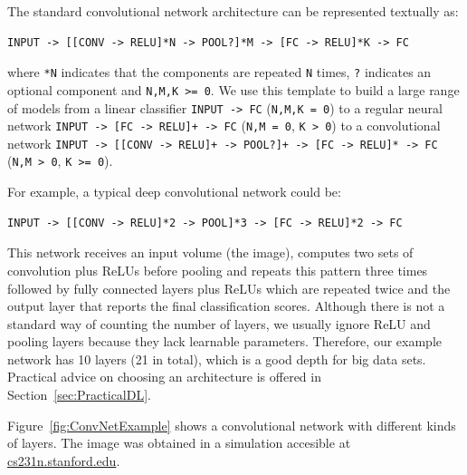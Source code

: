 \bigskip

The standard convolutional network architecture can be represented textually as:
\begin{verbatim}
INPUT -> [[CONV -> RELU]*N -> POOL?]*M -> [FC -> RELU]*K -> FC
\end{verbatim}
where \texttt{*N} indicates that the components are repeated \texttt{N} times, \texttt{?} indicates an optional component and \texttt{N,M,K >= 0}. We use this template to build a large range of models from a linear classifier \texttt{INPUT -> FC} (\texttt{N,M,K = 0}) to a regular neural network \texttt{INPUT -> [FC -> RELU]+ -> FC} (\texttt{N,M = 0}, \texttt{K > 0}) to a convolutional network \texttt{INPUT -> [[CONV -> RELU]+ -> POOL?]+ -> [FC -> RELU]* -> FC} (\texttt{N,M > 0}, \texttt{K >= 0}).

For example, a typical deep convolutional network could be:
\begin{verbatim}
INPUT -> [[CONV -> RELU]*2 -> POOL]*3 -> [FC -> RELU]*2 -> FC
\end{verbatim}
This network receives an input volume (the image), computes two sets of convolution plus ReLUs before pooling and repeats this pattern three times followed by fully connected layers plus ReLUs which are repeated twice and the output layer that reports the final classification scores. Although there is not a standard way of counting the number of layers, we usually ignore ReLU and pooling layers because they lack learnable parameters. Therefore, our example network has 10 layers (21 in total), which is a good depth for big data sets. Practical advice on choosing an architecture is offered in Section~\ref{sec:PracticalDL}.

Figure~\ref{fig:ConvNetExample} shows a convolutional network with different kinds of layers. The image was obtained in a simulation accesible at \url{cs231n.stanford.edu}.

